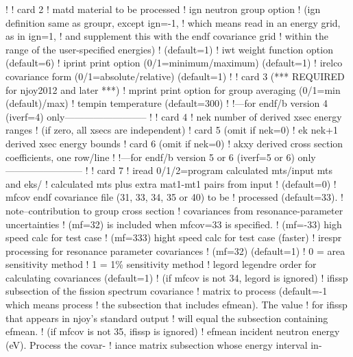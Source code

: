 \begin{ccode}
   !
   !  card 2
   !    matd    material to be processed
   !    ign     neutron group option
   !            (ign definition same as groupr, except ign=-1,
   !            which means read in an energy grid, as in ign=1,
   !            and supplement this with the endf covariance grid
   !            within the range of the user-specified energies)
   !            (default=1)
   !    iwt     weight function option (default=6)
   !    iprint  print option (0/1=minimum/maximum) (default=1)
   !    irelco  covariance form (0/1=absolute/relative) (default=1)
   !
   !  card 3    (*** REQUIRED for njoy2012 and later ***)
   !    mprint  print option for group averaging (0/1=min (default)/max)
   !    tempin  temperature (default=300)
   !
   !---for endf/b version 4 (iverf=4) only--------------------------
   !
   !  card 4
   !    nek     number of derived xsec energy ranges
   !            (if zero, all xsecs are independent)
   !  card 5    (omit if nek=0)
   !    ek      nek+1 derived xsec energy bounds
   !  card 6    (omit if nek=0)
   !    akxy    derived cross section coefficients, one row/line
   !
   !---for endf/b version 5 or 6 (iverf=5 or 6) only------------------------
   !
   !  card 7
   !    iread   0/1/2=program calculated mts/input mts and eks/
   !            calculated mts plus extra mat1-mt1 pairs from input
   !            (default=0)
   !    mfcov   endf covariance file (31, 33, 34, 35 or 40) to be
   !            processed (default=33).
   !            note--contribution to group cross section
   !            covariances from resonance-parameter uncertainties
   !            (mf=32) is included when mfcov=33 is specified.
   !            (mf=-33) high speed calc for test case
   !            (mf=333) hight speed calc for test case (faster)
   !    irespr  processing for resonance parameter covariances
   !            (mf=32) (default=1)
   !            0 = area sensitivity method
   !            1 = 1\% sensitivity method
   !    legord  legendre order for calculating covariances (default=1)
   !            (if mfcov is not 34, legord is ignored)
   !    ifissp  subsection of the fission spectrum covariance
   !            matrix to process (default=-1 which means process
   !            the subsection that includes efmean).  The value
   !            for ifissp that appears in njoy's standard output
   !            will equal the subsection containing efmean.
   !            (if mfcov is not 35, ifissp is ignored)
   !    efmean  incident neutron energy (eV).  Process the covar-
   !            iance matrix subsection whose energy interval in-

\end{ccode}

